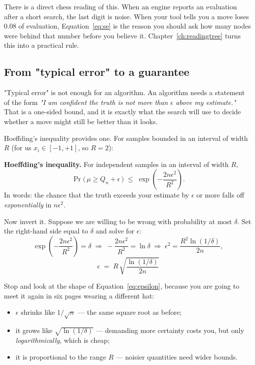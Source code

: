 There is a direct chess reading of this. When an engine reports an evaluation after a short
search, the last digit is noise. When your tool tells you a move loses $0.08$ of evaluation,
Equation~\eqref{eq:se} is the reason you should ask how many nodes were behind that number
before you believe it. Chapter~\ref{ch:readingtree} turns this into a practical rule.

\subsection{From "typical error" to a guarantee}

"Typical error" is not enough for an algorithm. An algorithm needs a statement of the form
\emph{"I am confident the truth is not more than $\epsilon$ above my estimate."} That is a
one-sided bound, and it is exactly what the search will use to decide whether a move might
still be better than it looks.

Hoeffding's inequality provides one. For samples bounded in an interval of width $R$ (for
us $x_i \in [-1,+1]$, so $R = 2$):

\begin{established}
\textbf{Hoeffding's inequality.} For independent samples in an interval of width $R$,
\begin{equation}
  \label{eq:hoeffding}
  \Pr\bigl(\,\mu \ge Q_n + \epsilon \,\bigr)\;\le\; \exp\!\left(-\frac{2n\epsilon^{2}}{R^{2}}\right).
\end{equation}
In words: the chance that the truth exceeds your estimate by $\epsilon$ or more falls off
\emph{exponentially} in $n\epsilon^2$.
\end{established}

Now invert it. Suppose we are willing to be wrong with probability at most $\delta$. Set the
right-hand side equal to $\delta$ and solve for $\epsilon$:
\[
\exp\!\left(-\frac{2n\epsilon^{2}}{R^{2}}\right) = \delta
\;\Longrightarrow\;
-\frac{2n\epsilon^{2}}{R^{2}} = \ln \delta
\;\Longrightarrow\;
\epsilon^{2} = \frac{R^{2}\ln(1/\delta)}{2n},
\]
\begin{equation}
  \label{eq:epsilon}
  \boxed{\;\epsilon \;=\; R\,\sqrt{\frac{\ln(1/\delta)}{2n}}\;}
\end{equation}

Stop and look at the shape of Equation~\eqref{eq:epsilon}, because you are going to meet it
again in six pages wearing a different hat:
\begin{itemize}
\item $\epsilon$ shrinks like $1/\sqrt{n}$ --- the same square root as before;
\item it grows like $\sqrt{\ln(1/\delta)}$ --- demanding more certainty costs you, but only
  \emph{logarithmically}, which is cheap;
\item it is proportional to the range $R$ --- noisier quantities need wider bounds.
\end{itemize}

